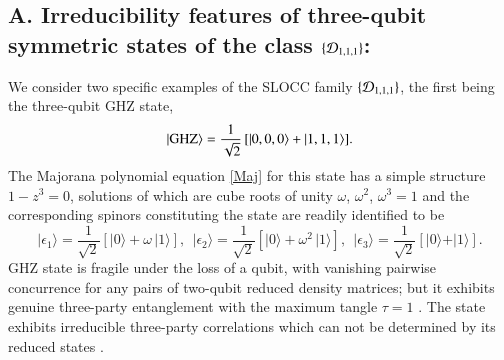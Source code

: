 {\subsection*{A. Irreducibility features of three-qubit symmetric states of the class $\{{\cal D}_{1,1,1} \}$:}

We consider two specific examples of the SLOCC family $\{{\cal D}_{1,1,1}\}$,  the first being the three-qubit 
GHZ state,  
\begin{equation}
\vert {\rm GHZ}\rangle= \frac{1}{\sqrt{2}}\, [\vert 0,0,0\rangle +  \vert 1,1,1\rangle].\label{GHZ}
\end{equation}      
The Majorana polynomial equation \eqref{Maj} for this state has a simple structure $1-z^3=0$, solutions of which are cube roots of unity $\omega$, $\omega^2$, $\omega^3=1$ and the corresponding spinors constituting the state are readily identified to be 
\begin{equation}
\vert \epsilon_1\rangle =\frac{1}{\sqrt{2}}[\vert 0\rangle+\omega\, \vert 1\rangle],\ \  \vert \epsilon_2\rangle =\frac{1}{\sqrt{2}}[\vert 0\rangle+\omega^2\, \vert 1\rangle], \ \ \vert \epsilon_3\rangle =\frac{1}{\sqrt{2}}[\vert 0\rangle+ \vert 1\rangle].\label{chap29-eq16}
\end{equation}
GHZ state is fragile under the loss of a qubit, with vanishing pairwise concurrence \cite{Wot,Wot2} for any pairs of two-qubit reduced density matrices; but it exhibits genuine three-party entanglement \cite{Dur,RaRe} with the maximum tangle  $\tau=1$ \cite{Kun}.  The state exhibits irreducible three-party correlations which can not be determined by its reduced states \cite{SP1,Walck,Walck2}. 

}
